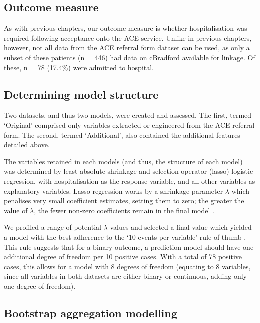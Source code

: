 \subsection{Outcome measure}

As with previous chapters, our outcome measure is whether hospitalisation was required following acceptance onto the ACE service. Unlike in previous chapters, however, not all data from the ACE referral form dataset can be used, as only a subset of these patients (n = 446) had data on cBradford available for linkage. Of these, n = 78 (17.4\%) were admitted to hospital.

\subsection{Determining model structure}
\label{sec:additional-model-structure}

Two datasets, and thus two models, were created and assessed. The first, termed `Original' comprised only variables extracted or engineered from the ACE referral form. The second, termed `Additional', also contained the additional features detailed above.

The variables retained in each models (and thus, the structure of each model) was determined by least absolute shrinkage and selection operator (lasso) logistic regression, with hospitalisation as the response variable, and all other variables as explanatory variables. Lasso regression works by a shrinkage parameter $\lambda$ which penalises very small coefficient estimates, setting them to zero; the greater the value of $\lambda$, the fewer non-zero coefficients remain in the final model \cite{Tibshirani2011}.

We profiled a range of potential $\lambda$ values and selected a final value which yielded a model with the best adherence to the `10 events per variable' rule-of-thumb \cite{Austin2017}. This rule suggests that for a binary outcome, a prediction model should have one additional degree of freedom per 10 positive cases. With a total of 78 positive cases, this allows for a model with 8 degrees of freedom (equating to 8 variables, since all variables in both datasets are either binary or continuous, adding only one degree of freedom).

\subsection{Bootstrap aggregation modelling}

